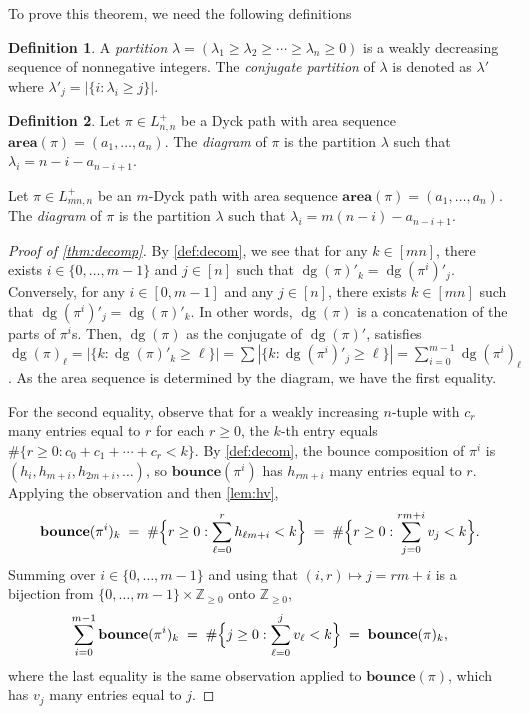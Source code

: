 \documentclass[12pt,reqno]{amsart}
\theoremstyle{definition}
\newtheorem{definition}{Definition}
\newcommand{\Z}{\mathbb Z}
\newcommand{\aarea}{\mathbf{area}}
\newcommand{\bbounce}{\mathbf{bounce}}
\DeclareMathOperator{\dg}{dg}
\begin{document}
To prove this theorem, we need the following definitions

\begin{definition}
A \emph{partition} $\lambda = (\lambda_1\geq \lambda_2 \geq \cdots \geq \lambda_n \geq 0)$ is a weakly decreasing sequence of nonnegative integers.
The \emph{conjugate partition} of $\lambda$ is denoted as $\lambda'$ where $\lambda'_j = |\{i: \lambda_i \geq j\}|$.
\end{definition}

\begin{definition}
Let $\pi \in L_{n,n}^+$ be a Dyck path with area sequence $\aarea(\pi) = (a_1,\dots,a_n)$.
The \emph{diagram} of $\pi$ is the partition $\lambda$ such that $\lambda_i = n-i-a_{n-i+1}$.

Let $\pi \in L_{mn,n}^+$ be an $m$-Dyck path with area sequence $\aarea(\pi) = (a_1,\dots,a_n)$.
The \emph{diagram} of $\pi$ is the partition $\lambda$ such that $\lambda_i = m(n-i)-a_{n-i+1}$.
\end{definition}

\begin{proof}[Proof of \cref{thm:decomp}]
By \cref{def:decom}, we see that for any $k \in [mn]$, there exists $i \in \{0,\dots,m-1\}$ and $j \in [n]$ such that $\dg(\pi)'_k = \dg(\pi^i)'_j$.
Conversely, for any $i \in [0,m-1]$ and any $j \in [n]$, there exists $k \in [mn]$ such that $\dg(\pi^i)'_j = \dg(\pi)'_k$.
In other words, $\dg(\pi)$ is a concatenation of the parts of $\pi^i$s.
Then, $\dg(\pi)$ as the conjugate of $\dg(\pi)'$, satisfies
$\dg(\pi)_\ell = |\{k: \dg(\pi)'_k \geq \ell\}| = \sum |\{k: \dg(\pi^i)'_j \geq \ell\}| = \sum_{i=0}^{m-1} \dg(\pi^i)_\ell$.
As the area sequence is determined by the diagram, we have the first equality.

For the second equality, observe that for a weakly increasing $n$-tuple with $c_r$ many entries equal to $r$ for each $r \geq 0$, the $k$-th entry equals $\#\{r \geq 0 : c_0 + c_1 + \cdots + c_r < k\}$.
By \cref{def:decom}, the bounce composition of $\pi^i$ is $(h_i, h_{m+i}, h_{2m+i}, \dots)$, so $\bbounce(\pi^i)$ has $h_{rm+i}$ many entries equal to $r$. Applying the observation and then \cref{lem:hv},
\[
\bbounce(\pi^i)_k
\;=\; \#\Bigl\{r \geq 0 : \sum_{\ell=0}^{r} h_{\ell m + i} < k\Bigr\}
\;=\; \#\Bigl\{r \geq 0 : \sum_{j=0}^{rm+i} v_j < k\Bigr\}.
\]
Summing over $i \in \{0,\dots,m-1\}$ and using that $(i,r) \mapsto j = rm+i$ is a bijection from $\{0,\dots,m-1\} \times \Z_{\geq 0}$ onto $\Z_{\geq 0}$,
\[
\sum_{i=0}^{m-1} \bbounce(\pi^i)_k
\;=\; \#\Bigl\{j \geq 0 : \sum_{\ell=0}^{j} v_\ell < k\Bigr\}
\;=\; \bbounce(\pi)_k,
\]
where the last equality is the same observation applied to $\bbounce(\pi)$, which has $v_j$ many entries equal to $j$.
\end{proof}
\end{document}
